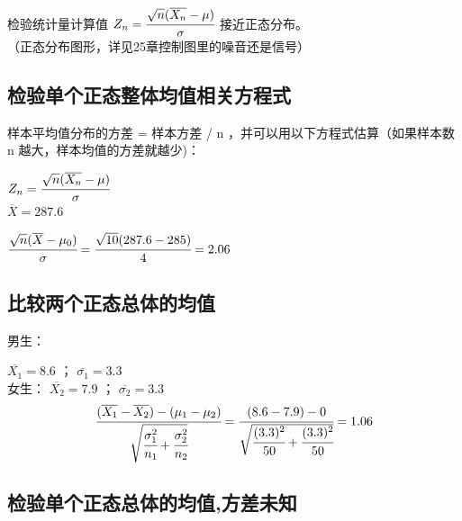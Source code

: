 检验统计量计算值
\(Z_n = \cfrac{ \sqrt{n}(\overline{X_n} - \mu) }{\sigma}\)
接近正态分布。\\

（正态分布图形，详见25章控制图里的噪音还是信号）

\hypertarget{ux68c0ux9a8cux5355ux4e2aux6b63ux6001ux6574ux4f53ux5747ux503cux76f8ux5173ux65b9ux7a0bux5f0f}{%
\subsection{检验单个正态整体均值相关方程式}\label{ux68c0ux9a8cux5355ux4e2aux6b63ux6001ux6574ux4f53ux5747ux503cux76f8ux5173ux65b9ux7a0bux5f0f}}

样本平均值分布的方差 = 样本方差 / n
，并可以用以下方程式估算（如果样本数n 越大，样本均值的方差就越少)：

\(Z_n = \cfrac{ \sqrt{n}(\overline{X_n} - \mu) }{\sigma}\)\\

\(\overline{X} = 287.6\)

\(\cfrac{ \sqrt{n}(\overline{X} - \mu_0) }{\sigma} = \cfrac{ \sqrt{10}( 287.6 - 285 ) }{4} = 2.06\)\\

\hypertarget{ux6bd4ux8f83ux4e24ux4e2aux6b63ux6001ux603bux4f53ux7684ux5747ux503c-1}{%
\subsection{比较两个正态总体的均值}\label{ux6bd4ux8f83ux4e24ux4e2aux6b63ux6001ux603bux4f53ux7684ux5747ux503c-1}}

\begin{description}
\tightlist
\item[]
男生：
\end{description}

\(\overline{X_1} = 8.6\) ； \(\overline{\sigma_1} = 3.3\)\\
女生： \(\overline{X_2} = 7.9\) ； \(\overline{\sigma_2} = 3.3\)\\

\[\cfrac{ (\overline{X_1} - \overline{X_2}) - ({\mu}_1  - {\mu}_2)}{\sqrt{\cfrac{\sigma_1^2}{n_1} + \cfrac{\sigma_2^2}{n_2}}} = \cfrac{ (8.6 - 7.9) - 0 }{\sqrt{\cfrac{(3.3)^2}{50} + \cfrac{(3.3)^2}{50}}} = 1.06\]

\hypertarget{ux68c0ux9a8cux5355ux4e2aux6b63ux6001ux603bux4f53ux7684ux5747ux503cux65b9ux5deeux672aux77e5-1}{%
\subsection{检验单个正态总体的均值,方差未知}\label{ux68c0ux9a8cux5355ux4e2aux6b63ux6001ux603bux4f53ux7684ux5747ux503cux65b9ux5deeux672aux77e5-1}}

